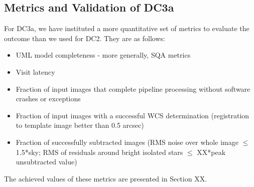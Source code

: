 \subsection{Metrics and Validation of DC3a}

For DC3a, we have instituted a more quantitative set of metrics to
evaluate the outcome than we used for DC2.  They are as follows:

\begin{itemize}
\item UML model completeness - more generally, SQA metrics
\item Visit latency
\item Fraction of input images that complete pipeline processing
  without software crashes or exceptions
\item Fraction of input images with a successful WCS determination
  (registration to template image better than 0.5 arcsec)
\item Fraction of successfully subtracted images (RMS noise over whole
  image $\leq$ 1.5*sky; RMS of residuals around bright isolated stars
  $\leq$ XX*peak unsubtracted value)
\end{itemize}

The achieved values of these metrics are presented in Section XX.
